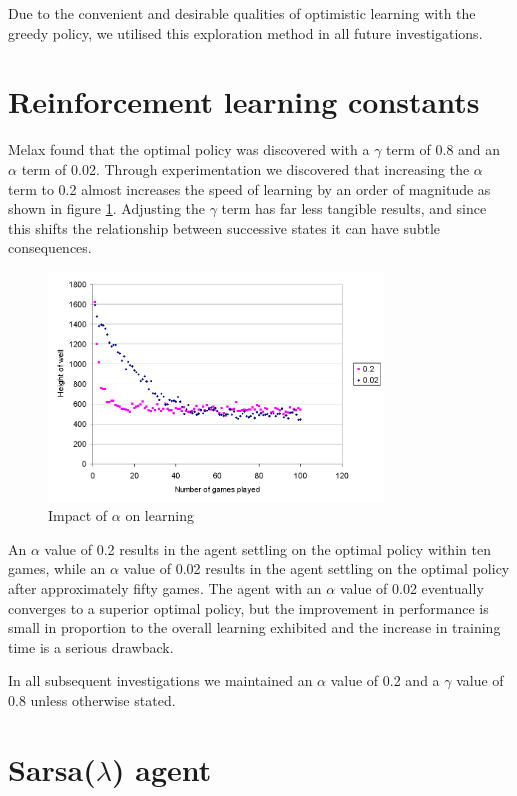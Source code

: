 \documentclass{rucsthesis}
\begin{document}
Due to the convenient and desirable qualities of optimistic learning with the greedy policy, we utilised this exploration method in all future investigations.

\section{Reinforcement learning constants \label{constants}}

Melax found that the optimal policy was discovered with a $\gamma$ term of 0.8 and an $\alpha$ term of 0.02. Through experimentation we discovered that increasing the $\alpha$ term to 0.2 almost increases the speed of learning by an order of magnitude as shown in figure \ref{fig:alpha}. Adjusting the $\gamma$ term has far less tangible results, and since this shifts the relationship between successive states it can have subtle consequences.

\begin{figure}[h]
\centering
\includegraphics[width=3.5in]{alphacomp.png}
\caption{Impact of $\alpha$ on learning}
\label{fig:alpha}
\end{figure} 

An $\alpha$ value of 0.2 results in the agent settling on the optimal policy within ten games, while an $\alpha$ value of 0.02 results in the agent settling on the optimal policy after approximately fifty games. The agent with an $\alpha$ value of 0.02 eventually converges to a superior optimal policy, but the improvement in performance is small in proportion to the overall learning exhibited and the increase in training time is a serious drawback.

In all subsequent investigations we maintained an $\alpha$ value of 0.2 and a $\gamma$ value of 0.8 unless otherwise stated.

\section{Sarsa($\lambda$) agent}
\end{document}
